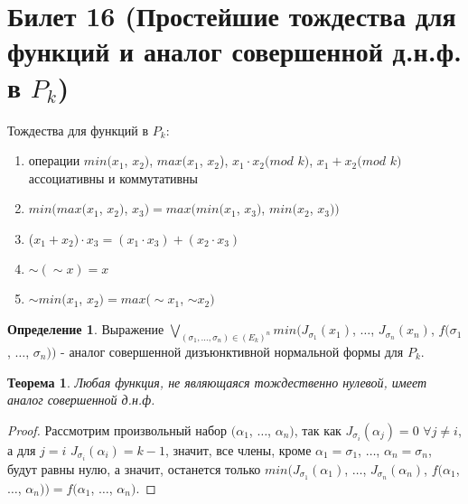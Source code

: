 \documentclass[a4paper, 12pt]{article}
\theoremstyle{definition}
\newtheorem*{definition}{Определение}
\theoremstyle{plain}
\newtheorem*{theorem}{Теорема}
\theoremstyle{remark}
\begin{document}
  \section{Билет 16 (Простейшие тождества для функций и аналог совершенной д.н.ф. в $P_k$)}
  Тождества для функций в $P_k$:
  \begin{enumerate}
    \item операции $min(x_1$, $x_2)$, $max(x_1$, $x_2$), $x_1\cdot x_2(mod$ $k)$, $x_1+x_2(mod$ $k)$ ассоциативны и коммутативны
    \item $min(max(x_1$, $x_2)$, $x_3)=max(min(x_1$, $x_3)$, $min(x_2$, $x_3))$
    \item ($x_1+x_2)\cdot x_3=(x_1\cdot x_3)+(x_2\cdot x_3)$
    \item $\sim(\sim x)=x$
    \item $\sim min(x_1$, $x_2)=max(\sim x_1$, $\sim x_2)$
  \end{enumerate}
  \begin{definition}
    Выражение $\bigvee\limits_{(\sigma_1,\ldots,\sigma_n)\in (E_k)^n}min(J_{\sigma_1}(x_1)$, $\ldots$, $J_{\sigma_n}(x_n)$, $f(\sigma_1$, $\ldots$, $\sigma_n))$ - аналог совершенной дизъюнктивной нормальной формы для $P_k$.
  \end{definition}
  \begin{theorem}
    Любая функция, не являющаяся тождественно нулевой, имеет аналог совершенной д.н.ф.
  \end{theorem}
  \begin{proof}
    Рассмотрим произвольный набор $(\alpha_1$, $\ldots$, $\alpha_n)$, так как $J_{\sigma_i}(\alpha_j)=0$ $\forall j\neq i$, а для $j=i$ $J_{\sigma_i}(\alpha_i)=k-1$, значит, все члены, кроме $\alpha_1=\sigma_1$, $\ldots$, $\alpha_n=\sigma_n$, будут равны нулю, а значит, останется только $min(J_{\sigma_1}(\alpha_1)$, $\ldots$, $J_{\sigma_n}(\alpha_n)$, $f(\alpha_1$, $\ldots$, $\alpha_n))=f(\alpha_1$, $\ldots$, $\alpha_n)$.
  \end{proof}
\end{document}
